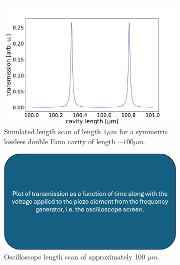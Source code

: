 \begin{figure}[h!]
    \centering
    \begin{subfigure}[b]{0.49\textwidth}
        \includegraphics[width=\textwidth]{figures/length_scan_symmetric_lossless.pdf}
        \caption{Simulated length scan of length $1 \mu m$ for a symmetric lossless double Fano cavity of length $\sim 100 \mu m$.}
        \label{fig:length_scan_sim}
    \end{subfigure}
    \begin{subfigure}[b]{0.49\textwidth}
        \includegraphics[width=\textwidth]{figures/placerholder.png}
        \caption{Oscilloscope length scan of approximately 100 $\mu m$.}
        \label{fig:lenght_scan_scope}
    \end{subfigure}
    \caption{}
    \label{fig:length_scan}
\end{figure}

